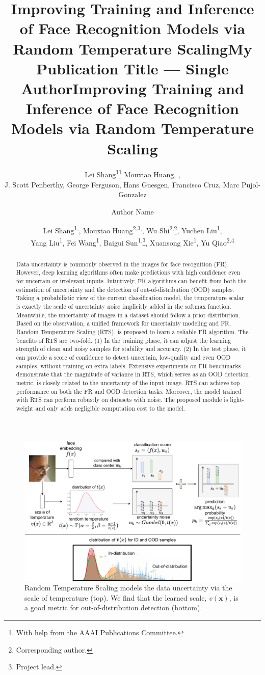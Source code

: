 \documentclass[letterpaper]{article} %
\title{Improving Training and Inference of Face Recognition Models via Random Temperature Scaling}
\author{
    Lei Shang\textsuperscript{\rm 1}\thanks{With help from the AAAI Publications Committee.}
    Mouxiao Huang,
    ,\\
    J. Scott Penberthy,
    George Ferguson,
    Hans Guesgen,
    Francisco Cruz\equalcontrib,
    Marc Pujol-Gonzalez\equalcontrib
}
\title{My Publication Title --- Single Author}
\author {
    Author Name
}
\title{Improving Training and Inference of Face Recognition Models via Random Temperature Scaling}
\author {
    Lei Shang\textsuperscript{\rm 1,}\equalcontrib,
    Mouxiao Huang\textsuperscript{\rm 2,3,}\equalcontrib,
    Wu Shi\textsuperscript{\rm 2,}\thanks{Corresponding author.},
    Yuchen Liu\textsuperscript{\rm 1},\\
    Yang Liu\textsuperscript{\rm 1},
    Fei Wang\textsuperscript{\rm 1},
    Baigui Sun\textsuperscript{\rm 1,}\thanks{Project lead.},
    Xuansong Xie\textsuperscript{\rm 1},
    Yu Qiao\textsuperscript{\rm 2,4}
}
\begin{document}
\maketitle

\begin{abstract}
Data uncertainty is commonly observed in the images for face recognition (FR). However, deep learning algorithms often make predictions with high confidence even for uncertain or irrelevant inputs. Intuitively, FR algorithms can benefit from both the estimation of uncertainty and the detection of out-of-distribution (OOD) samples. Taking a probabilistic view of the current classification model, the temperature scalar is exactly the scale of uncertainty noise implicitly added in the softmax function. Meanwhile, the uncertainty of images in a dataset should follow a prior distribution. Based on the observation, a unified framework for uncertainty modeling and FR, Random Temperature Scaling (RTS), is proposed to learn a reliable FR algorithm. The benefits of RTS are two-fold. (1) In the training phase, it can adjust the learning strength of clean and noisy samples for stability and accuracy. (2) In the test phase, it can provide a score of confidence to detect uncertain, low-quality and even OOD samples, without training on extra labels. Extensive experiments on FR benchmarks demonstrate that the magnitude of variance in RTS, which serves as an OOD detection metric, is closely related to the uncertainty of the input image. RTS can achieve top performance on both the FR and OOD detection tasks. Moreover, the model trained with RTS can perform robustly on datasets with noise. The proposed module is light-weight and only adds negligible computation cost to the model.
\end{abstract}

\begin{figure}[t]
   \centering
   \includegraphics[width=0.95\linewidth]{figures/fig-teaser-large-fix.pdf}
   \caption{Random Temperature Scaling models the data uncertainty via the scale of temperature (top). We find that the learned scale, $v(\bm{x})$, is a good metric for out-of-distribution detection (bottom).}
\label{fig:intro}
\end{figure}
\end{document}
